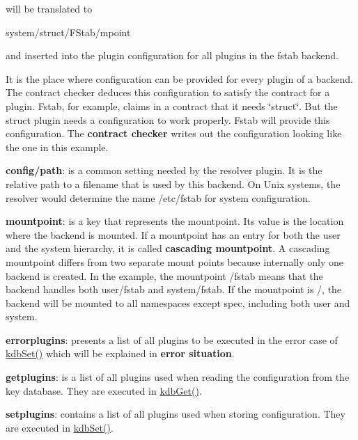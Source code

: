will be translated to \begin{DoxyVerb}    system/struct/FStab/mpoint
\end{DoxyVerb}


and inserted into the plugin configuration for all plugins in the {\ttfamily fstab} backend.

It is the place where configuration can be provided for every plugin of a backend. The contract checker deduces this configuration to satisfy the contract for a plugin. Fstab, for example, claims in a contract that it needs \char`\"{}struct\char`\"{}. But the struct plugin needs a configuration to work properly. Fstab will provide this configuration. The {\bfseries contract checker} writes out the configuration looking like the one in this example.


\begin{DoxyItemize}
\item {\bfseries config/path}\+: is a common setting needed by the resolver plugin. It is the relative path to a filename that is used by this backend. On Unix systems, the resolver would determine the name {\ttfamily /etc/fstab} for system configuration.
\item {\bfseries mountpoint}\+: is a key that represents the mountpoint. Its value is the location where the backend is mounted. If a mountpoint has an entry for both the user and the system hierarchy, it is called {\bfseries cascading mountpoint}. A cascading mountpoint differs from two separate mount points because internally only one backend is created. In the example, the mountpoint {\ttfamily /fstab} means that the backend handles both {\ttfamily user/fstab} and {\ttfamily system/fstab}. If the mountpoint is {\ttfamily /}, the backend will be mounted to all namespaces except {\ttfamily spec}, including both {\ttfamily user} and {\ttfamily system}.
\item {\bfseries errorplugins}\+: presents a list of all plugins to be executed in the error case of {\ttfamily \hyperlink{group__kdb_ga11436b058408f83d303ca5e996832bcf}{kdb\+Set()}} which will be explained in {\bfseries error situation}.
\item {\bfseries getplugins}\+: is a list of all plugins used when reading the configuration from the key database. They are executed in {\ttfamily \hyperlink{group__kdb_ga28e385fd9cb7ccfe0b2f1ed2f62453a1}{kdb\+Get()}}.
\item {\bfseries setplugins}\+: contains a list of all plugins used when storing configuration. They are executed in {\ttfamily \hyperlink{group__kdb_ga11436b058408f83d303ca5e996832bcf}{kdb\+Set()}}.
\end{DoxyItemize}


